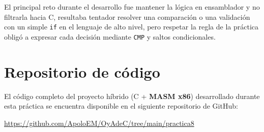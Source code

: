 \documentclass[a4paper,12pt]{article}
\begin{document}
El principal reto durante el desarrollo fue mantener la lógica en ensamblador y no filtrarla hacia C, resultaba tentador resolver una comparación o una validación con un simple \texttt{if} en el lenguaje de alto nivel, pero respetar la regla de la práctica obligó a expresar cada decisión mediante \texttt{CMP} y saltos condicionales.

\newpage
\nocite{*}
\printbibliography[title={Referencias}]

\appendix
\section{Repositorio de código}
El código completo del proyecto híbrido (C + \textbf{MASM x86}) desarrollado durante esta práctica se encuentra disponible en el siguiente repositorio de GitHub:

\begin{center}
\url{https://github.com/ApoloEM/OyAdeC/tree/main/practica8}
\end{center}
\end{document}
